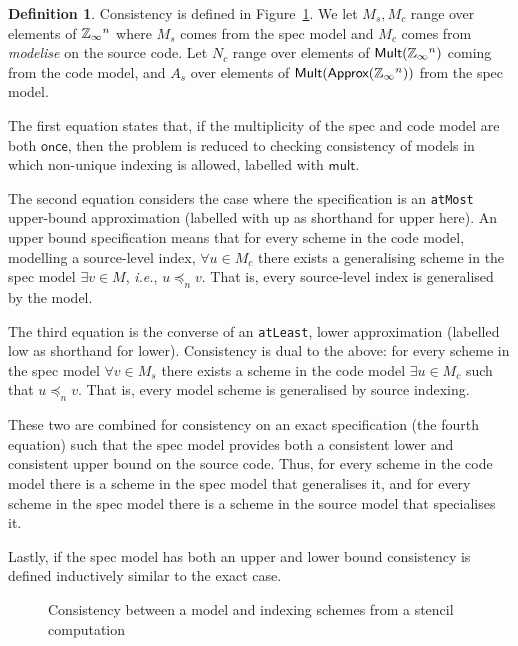 \documentclass[9pt]{sigplanconf}
\newcounter{block}
\theoremstyle{definition}
\newtheorem{definition}[block]{Definition}
\newcommand{\ie}{\emph{i.e.}}
\newcommand{\term}[1]{\texttt{#1}}
\begin{document}
\begin{definition}
Consistency is defined in Figure~\ref{fig:consistency}. We let
$M_s, M_c$ range over elements of $\mathbb{Z}_\infty{}^n$ where $M_s$ comes
from the spec model and $M_c$ comes from \textit{modelise} on the
source code. Let $N_c$ range over elements of
$\textsf{Mult}(\mathbb{Z}_\infty{}^n)$ coming from the code model, and $A_s$
over elements of $\textsf{Mult}(\textsf{Approx}(\mathbb{Z}_\infty{}^n))$ from the spec model.

The first equation states that, if the multiplicity of the spec and code
model are both $\mathsf{once}$, then the problem is reduced to checking consistency of
models in which non-unique indexing is allowed, labelled with
$\mathsf{mult}$. 

The second equation considers the case where the specification is
an \term{atMost} upper-bound approximation (labelled with \textsf{up}
as shorthand for \textsf{upper} here). 
An upper bound specification means that for every scheme in the code
model, modelling a source-level index, $\forall u \in M_c$ there exists
a generalising scheme in the spec model $\exists v \in M$, \ie{}, $u
\preceq_n v$. That is, every source-level index is generalised by the model.

The third equation is the converse of an \term{atLeast},
lower approximation (labelled \textsf{low} as shorthand for
\textsf{lower}). Consistency is dual to the above: 
for every scheme in the spec model $\forall v \in M_s$ there
exists a scheme in the code model $\exists u \in M_c$ such that $u
\preceq_n v$. That is, every model scheme is generalised by source indexing.

These two are combined for consistency on an \textsf{exact}
specification (the fourth equation) such that the spec model
provides both a consistent lower and consistent upper bound on
the source code. Thus, for every scheme in the code model there
is a scheme in the spec model that generalises it, and for every
scheme in the spec model there is a scheme in the source model that
specialises it.  

Lastly, if the spec model has both an upper and lower bound
consistency is defined inductively similar to the \textsf{exact} case.
\end{definition}

\begin{figure}
\vspace{-0.4em}

\caption{Consistency between a model and indexing schemes from a stencil computation}
\label{fig:consistency}
\vspace{-0.9em}
\end{figure}
\end{document}
